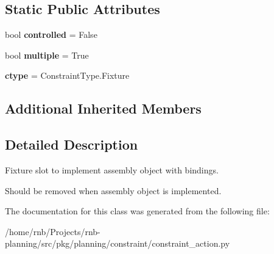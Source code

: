 \subsection*{Static Public Attributes}
\begin{DoxyCompactItemize}
\item 
\mbox{\label{classrnb-planning_1_1src_1_1pkg_1_1planning_1_1constraint_1_1constraint__action_1_1_fixture_slot_ab590f5e9ded7f5abe0ef18a9210e7b4b}} 
bool {\bfseries controlled} = False
\item 
\mbox{\label{classrnb-planning_1_1src_1_1pkg_1_1planning_1_1constraint_1_1constraint__action_1_1_fixture_slot_a01a38b073ed0aa656a3b3599be54e417}} 
bool {\bfseries multiple} = True
\item 
\mbox{\label{classrnb-planning_1_1src_1_1pkg_1_1planning_1_1constraint_1_1constraint__action_1_1_fixture_slot_a699b12039dc60e79a386bb245de15205}} 
{\bfseries ctype} = Constraint\+Type.\+Fixture
\end{DoxyCompactItemize}
\subsection*{Additional Inherited Members}


\subsection{Detailed Description}
Fixture slot to implement assembly object with bindings. 

Should be removed when assembly object is implemented. 

The documentation for this class was generated from the following file\+:\begin{DoxyCompactItemize}
\item 
/home/rnb/\+Projects/rnb-\/planning/src/pkg/planning/constraint/constraint\+\_\+action.\+py\end{DoxyCompactItemize}
